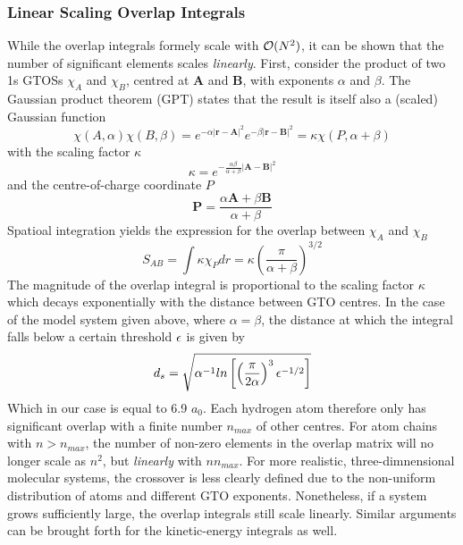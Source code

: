 \subsubsection{Linear Scaling Overlap Integrals}

While the overlap integrals formely scale with $\mathcal{O}(N^{2})$, it can be shown that the number of significant elements scales \emph{linearly}. First, consider the product of two 1s GTOSs $\chi_{A}$ and $\chi_{B}$, centred at $\mathbf{A}$ and $\mathbf{B}$, with exponents $\alpha$ and $\beta$. The Gaussian product theorem (GPT) states that the result is itself also a (scaled) Gaussian function
\begin{equation}
\chi(A,\alpha) \chi(B,\beta) = e^{-\alpha \left\lvert \mathbf{r} - \mathbf{A} \right\rvert^2} e^{-\beta \left\lvert \mathbf{r} - \mathbf{B} \right\rvert^2} = \kappa \chi(P,\alpha+\beta)  
\end{equation}
\noindent with the scaling factor $\kappa$ 
\begin{equation}
\kappa = e^{-\frac{\alpha\beta}{\alpha+\beta}\left\lvert \mathbf{A} - \mathbf{B} \right\rvert^2}
\end{equation}
\noindent and the centre-of-charge coordinate $P$
\begin{equation}
\mathbf{P} = \frac{\alpha \mathbf{A} + \beta \mathbf{B}}{\alpha + \beta}
\end{equation}
\noindent Spatioal integration yields the expression for the overlap between $\chi_A$ and $\chi_B$
\begin{equation}
S_{AB} = \int \kappa \chi_{P} dr = \kappa \left(\frac{\pi}{\alpha + \beta}\right)^{3/2}
\end{equation} 
\noindent The magnitude of the overlap integral is proportional to the scaling factor $\kappa$ which decays exponentially with the distance between GTO centres. In the case of the model system given above, where $\alpha = \beta$, the distance at which the integral falls below a certain threshold $\epsilon$ is given by 
\begin{equation}
d_s = \sqrt{\alpha^{-1} ln \left[ \left( \frac{\pi}{2\alpha}\right)^3 \epsilon^{-1/2} \right]}
\end{equation} 
\noindent Which in our case is equal to 6.9 $a_0$. Each hydrogen atom therefore only has significant overlap with a finite number $n_{max}$ of other centres. For atom chains with $n > n_{max}$, the number of non-zero elements in the overlap matrix will no longer scale as $n^2$, but \emph{linearly} with $nn_{max}$. For more realistic, three-dimnensional molecular systems, the crossover is less clearly defined due to the non-uniform distribution of atoms and different GTO exponents. Nonetheless, if a system grows sufficiently large, the overlap integrals still scale linearly. Similar arguments can be brought forth for the kinetic-energy integrals as well. 


